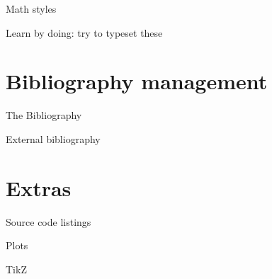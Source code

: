 \documentclass[xetex, onlymath]{beamer}
\begin{document}
\begin{frame}{Math styles}
\end{frame}

\begin{frame}{Learn by doing: try to typeset these}
\centering
{}
\end{frame}

\section{Bibliography management}
\begin{frame}{The Bibliography}
\end{frame}

\begin{frame}{External bibliography}
\end{frame}

\section{Extras}
\begin{frame}{Source code listings}
\end{frame}

\begin{frame}{Plots}
\end{frame}

\begin{frame}{TikZ}
\end{frame}
\end{document}
